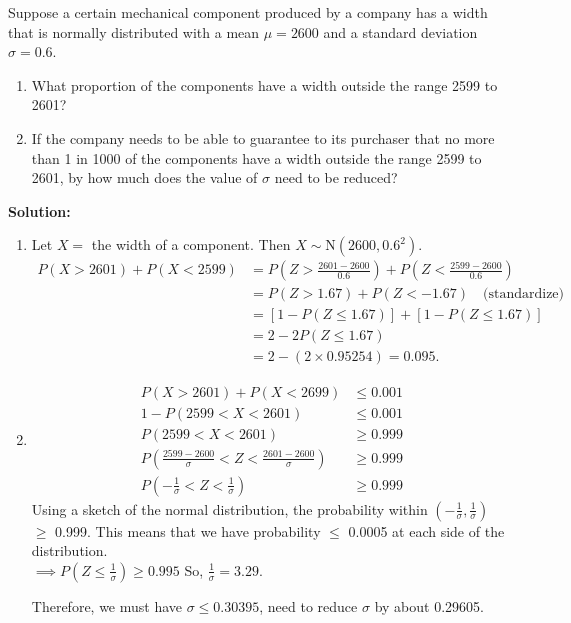\pagebreak

\begin{example}
    Suppose a certain mechanical component produced by a company has a width that is normally distributed with a mean $\mu = 2600$ and a standard deviation $\sigma = 0.6$.
    \begin{enumerate}[label=(\alph*)]
        \item What proportion of the components have a width outside the range 2599 to 2601?
        \item If the company needs to be able to guarantee to its purchaser that no more than 1 in 1000 of the
        components have a width outside the range 2599 to 2601, by how much does the value of $\sigma$ need to be reduced?
    \end{enumerate}

    \textbf{Solution:} 
    \begin{enumerate}[label=(\alph*)]
        \item Let $X = $ the width of a component. Then $X \sim \text{N}(2600,0.6^2)$. \vspace{-2mm}
        \begin{align*}
            P(X > 2601) + P(X < 2599) &= P(Z > \frac{2601 - 2600}{0.6}) + P(Z < \frac{2599 - 2600}{0.6}) \\
            &= P(Z > 1.67) + P(Z < -1.67) \quad \text{(standardize)} \\
            &= \left[ 1 - P(Z \leq 1.67) \right] + \left[ 1 - P(Z \leq 1.67) \right] \\
            &= 2 - 2P(Z \leq 1.67) \\
            &= 2 - (2 \times 0.95254) = 0.095.
        \end{align*}
        \item \phantom{} \vspace{-2mm}
        \begin{align*}
            P(X > 2601) + P(X < 2699) &\leq 0.001 \\
            1 - P(2599 < X < 2601) &\leq 0.001 \\
            P(2599 < X < 2601) &\geq 0.999 \\
            P(\frac{2599-2600}{\sigma} < Z < \frac{2601 - 2600}{\sigma}) &\geq 0.999 \\
            P(-\frac{1}{\sigma} < Z < \frac{1}{\sigma}) &\geq 0.999
        \end{align*}
        Using a sketch of the normal distribution, the probability within $(-\frac{1}{\sigma},\frac{1}{\sigma})$ $\geq$ 0.999. This means that we have probability $\leq$ 0.0005 at each side of the distribution. \\
        $\implies P(Z \leq \frac{1}{\sigma}) \geq 0.995$ So, $\frac{1}{\sigma} = 3.29$.

        Therefore, we must have $\sigma \leq 0.30395$, need to reduce $\sigma$ by about 0.29605.
    \end{enumerate}
\end{example}

